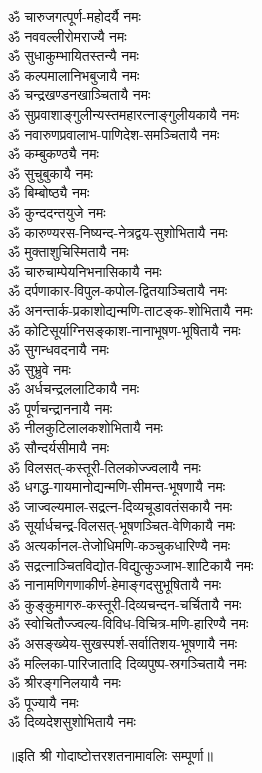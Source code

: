 \begin{multicols}{2}
\begin{flushleft}
ॐ चारुजगत्पूर्ण-महोदर्यै नमः\\
ॐ नववल्लीरोमराज्यै नमः\\
ॐ सुधाकुम्भायितस्तन्यै नमः\\
ॐ कल्पमालानिभबुजायै नमः\\
ॐ चन्द्रखण्डनखाञ्चितायै नमः\hfill{}\\
ॐ सुप्रवाशाङ्गुलीन्यस्तमहा\-रत्नाङ्गुलीयकायै नमः\\
ॐ नवारुणप्रवालाभ-पाणिदेश-समञ्चितायै नमः\\
ॐ कम्बुकण्ठ्यै नमः\\
ॐ सुचुबुकायै नमः\\
ॐ बिम्बोष्ठ्यै नमः\\
ॐ कुन्ददन्तयुजे नमः\\
ॐ कारुण्यरस-निष्यन्द-नेत्रद्वय-सुशोभितायै नमः\\
ॐ मुक्ताशुचिस्मितायै नमः\\
ॐ चारुचाम्पेयनिभनासिकायै नमः\\
ॐ दर्पणाकार-विपुल-कपोल-द्वितयाञ्चितायै नमः\hfill{}\\
ॐ अनन्तार्क-प्रकाशोद्यन्मणि-ताटङ्क-शोभितायै नमः\\
ॐ कोटिसूर्याग्निसङ्काश-नानाभूषण-भूषितायै नमः\\
ॐ सुगन्धवदनायै नमः\\
ॐ सुभ्रुवे नमः\\
ॐ अर्धचन्द्रललाटिकायै नमः\\
ॐ पूर्णचन्द्राननायै नमः\\
ॐ नीलकुटिलालकशोभितायै नमः\\
ॐ सौन्दर्यसीमायै नमः\\
ॐ विलसत्-कस्तूरी-तिलकोज्ज्वलायै नमः\\
ॐ धगद्ध-गायमानोद्यन्मणि-सीमन्त-भूषणायै नमः\hfill{}\\
ॐ जाज्वल्यमाल-सद्रत्न-दिव्यचूडावतंसकायै नमः\\
ॐ सूर्यार्धचन्द्र-विलसत्-भूषणञ्चित-वेणिकायै नमः\\
ॐ अत्यर्कानल-तेजोधिमणि-कञ्चुकधारिण्यै नमः\\
ॐ सद्रत्नाञ्चितविद्योत-विद्युत्कुञ्जाभ-शाटिकायै नमः\\
ॐ नानामणिगणाकीर्ण-हेमाङ्गदसुभूषितायै नमः\\
ॐ कुङ्कुमागरु-कस्तूरी-दिव्यचन्दन-चर्चितायै नमः\\
ॐ स्वोचितौज्ज्वल्य-विविध-विचित्र-मणि-हारिण्यै नमः\\
ॐ असङ्ख्येय-सुखस्पर्श-सर्वातिशय-भूषणायै नमः\\
ॐ मल्लिका-पारिजातादि  दिव्यपुष्प-स्रगञ्चितायै नमः\\
ॐ श्रीरङ्गनिलयायै नमः\hfill{}\\
ॐ पूज्यायै नमः\\
ॐ दिव्यदेशसुशोभितायै नमः\\
\end{flushleft}
\end{multicols}
\centerline{॥इति श्री गोदाष्टोत्तरशतनामावलिः सम्पूर्णा॥}
